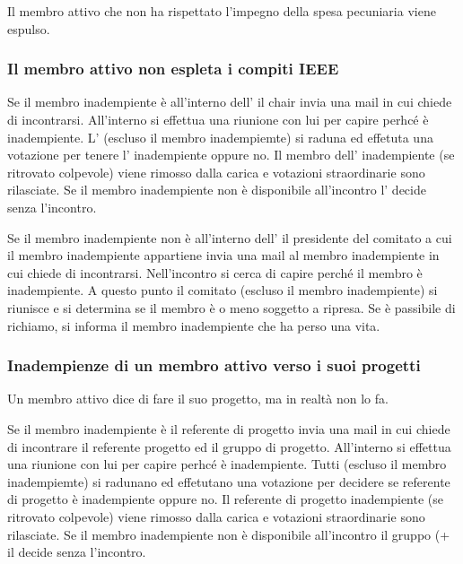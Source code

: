 Il membro attivo che non ha rispettato l'impegno della spesa pecuniaria viene espulso.

\subsubsection{Il membro attivo non espleta i compiti IEEE}


Se il membro inadempiente è all'interno dell'\EC{} il chair invia una mail in cui chiede di incontrarsi. All'interno si effettua una riunione con lui per capire perhcé è inadempiente. L'\EC{} (escluso il membro inadempiemte) si raduna ed effetuta una votazione per tenere l'\EC{} inadempiente oppure no. Il membro dell'\EC{} inadempiente (se ritrovato colpevole) viene rimosso dalla carica e votazioni straordinarie sono rilasciate. Se il membro inadempiente non è disponibile all'incontro l'\EC{} decide senza l'incontro.


Se il membro inadempiente non è all'interno dell'\EC{} il presidente del comitato a cui il membro inadempiente appartiene invia una mail al membro inadempiente in cui chiede di incontrarsi. Nell'incontro si cerca di capire perché il membro è inadempiente. A questo punto il comitato (escluso il membro inadempiente) si riunisce e si determina se il membro è o meno soggetto a ripresa. Se è passibile di richiamo, si informa il membro inadempiente che ha perso una vita.


\subsubsection{Inadempienze di un membro attivo verso i suoi progetti}

Un membro attivo dice di fare il suo progetto, ma in realtà non lo fa.


Se il membro inadempiente è il referente di progetto  invia una mail in cui chiede di incontrare il referente progetto ed il gruppo di progetto. All'interno si effettua una riunione con lui per capire perhcé è inadempiente. Tutti (escluso il membro inadempiemte) si radunano ed effetutano una votazione per decidere se referente di progetto è inadempiente oppure no. Il referente di progetto inadempiente (se ritrovato colpevole) viene rimosso dalla carica e votazioni straordinarie sono rilasciate. Se il membro inadempiente non è disponibile all'incontro il gruppo (+ il  decide senza l'incontro.

